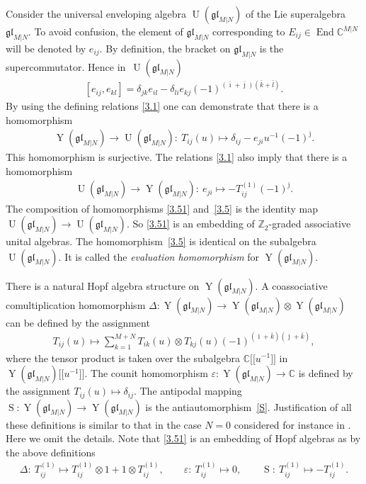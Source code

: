 \documentclass[10pt,a4paper]{amsart}
\numberwithin{equation}{section}
\def\1{^{-1}}
\def\bi{{\bar\imath }}
\def\bj{{\bar\jmath }}
\def\bk{{\bar k }}
\def\bl{{\bar l }}
\def\CC{{\mathbb{C}}}
\def\CMN{\CC^{M|N}}
\def\de{\delta}
\def\De{\Delta}
\def\End{\operatorname{End}}
\def\ep{\varepsilon}
\def\glMN{\mathfrak{gl}_{M|N}}
\def\ot{\otimes}
\def\S{\operatorname{S}}
\def\UMN{\operatorname{U}(\glMN)}
\def\YMN{\operatorname{Y}(\glMN)}
\def\ZZ{\mathbb{Z}}
\begin{document}
Consider the universal enveloping
algebra $\UMN$ of the Lie superalgebra $\glMN $.
To avoid confusion, the element of $\glMN$
corresponding to $E_{ij}\in\End\CMN$ will be denoted by $e_{ij} $.
By definition, the bracket on $\glMN$ is the supercommutator.
Hence in~$\UMN$
\begin{gather}\label{glMN}
[ e_{ij} ,e_{kl} ]=
\de_{jk} e_{il}-
\de_{li} e_{kj}
{(-1)}^{( \bi+ \bj )( \bk+ \bl )} .
\end{gather}
By using the defining relations \eqref{3.1} one can demonstrate that
there is a homomorphism
\begin{gather}\label{3.5}
\YMN\to\UMN\colon \ T_{ij}(u)\mapsto \de_{ij}-e_{ji} u^{-1} {(-1)}^{\bj} .
\end{gather}
This homomorphism is surjective. The relations \eqref{3.1} also imply that there is a homomorphism
\begin{gather}\label{3.51}
\UMN\to\YMN\colon \
e_{ji}\mapsto- T_{ij}^{(1)} {(-1)}^{\bj} .
\end{gather}
The composition of homomorphisms \eqref{3.51}
and~\eqref{3.5}
is the identity map $\UMN\to\UMN $. So
\eqref{3.51} is an embedding of $\ZZ_2$-graded associative unital algebras.
The homomorphism~\eqref{3.5} is identical on the subalgebra~$\UMN $.
It is called
the {\it evaluation homomorphism} for $\YMN $.

There is a natural Hopf algebra structure on $\YMN $.
A coassociative comultiplication homomorphism $\De\colon \YMN\to\YMN\ot\YMN$
can be defined by the assignment
\begin{gather}\label{3.7}
T_{ij}(u)\mapsto\sum_{k=1}^{M+N}
T_{ik}(u)\ot T_{kj}(u)
{(-1)}^{( \bi + \bk )( \bj + \bk )},
\end{gather}
where the tensor product is taken over the subalgebra $\CC\big[\big[u^{-1}\big]\big]$
in $\YMN \big[\big[u\1\big]\big] $.
The counit homomorphism $\ep\colon \YMN\to\CC$ is defined
by the assignment $T_{ij}(u)\mapsto\de_{ij} $.
The antipodal mapping $\S\colon \YMN\to\YMN$ is the antiautomorphism~\eqref{S}.
Justification of all these
definitions is similar to that in the case $N=0$
considered for instance in \cite[Section~1]{MNO}. Here we omit the details.
Note that \eqref{3.51} is an embedding of Hopf algebras as
by the above definitions
\begin{gather*}
\De\colon \ T_{ij}^{(1)}\mapsto T_{ij}^{(1)}\ot1+1\ot T_{ij}^{(1)} ,
\qquad
\ep\colon \ T_{ij}^{(1)}\mapsto0 ,
\qquad
\S\colon \ T_{ij}^{(1)}\mapsto- T_{ij}^{(1)} .
\end{gather*}
\end{document}
